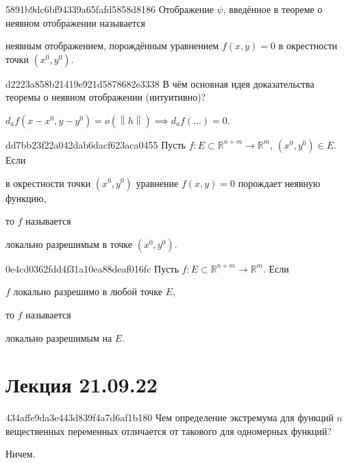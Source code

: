 \begin{note}{5891b9dc6bf94339a65fafd5858d8186}
    Отображение \({ \psi }\), введённое в теореме о неявном отображении называется \begin{icloze}{1}неявным отображением, порождённым уравнением \({ f(x, y) = 0 }\) в окрестности точки \({ (x^{0}, y^{0}) }\).\end{icloze}
\end{note}

\begin{note}{d2223a858b21419e921d5878682e3338}
    В чём основная идея доказательства теоремы о неявном отображении (интуитивно)?

    \begin{cloze}{1}
        \({ d_{a}f(x - x^{0}, y - y^{0}) = o(\left\lVert h \right\rVert) \implies d_{a}f(\ldots) = 0 }\).
    \end{cloze}
\end{note}

\begin{note}{dd7bb23f22a042dab6dacf623aca0455}
    Пусть \({ f : E \subset \mathbb R^{n+m} \to \mathbb R^{m} }\),\: \({ (x^{0}, y^{0}) \in E }\).
    Если
    \begin{icloze}{2}
        в окрестности точки \({ (x^0, y^0) }\) уравнение \({ f(x, y) = 0 }\) порождает неявную функцию,
    \end{icloze}
    то \({ f }\) называется \begin{icloze}{1}локально разрешимым в точке \({ (x^0, y^0) }\).\end{icloze}
\end{note}

\begin{note}{0e4cd0362fdd4f31a10ea88deaf016fc}
    Пусть \({ f : E \subset \mathbb R^{n+m} \to \mathbb R^{m} }\).
    Если \begin{icloze}{2}\({ f }\) локально разрешимо в любой точке \({ E }\),\end{icloze} то \({ f }\) называется \begin{icloze}{1}локально разрешимым на \({ E }\).\end{icloze}
\end{note}

\section{Лекция 21.09.22}
\begin{note}{434affe9da3e443d839f4a7d6af1b180}
    Чем определение экстремума для функций \({ n }\) вещественных переменных отличается от такового для одномерных функций?

    \begin{cloze}{1}
        Ничем.
    \end{cloze}
\end{note}

